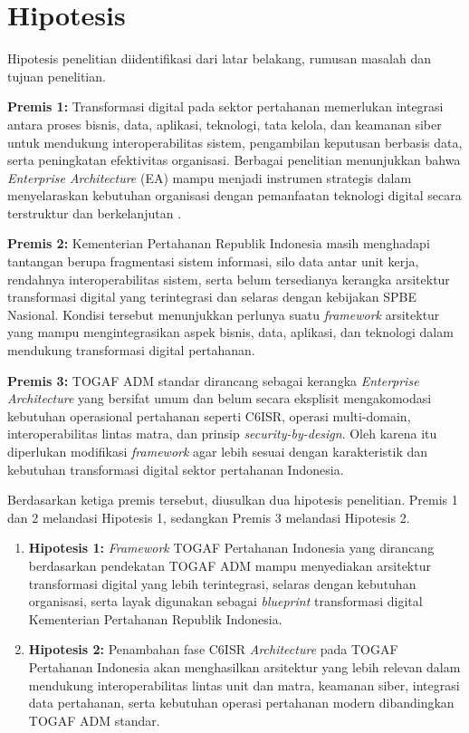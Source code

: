 \section{Hipotesis}
Hipotesis penelitian diidentifikasi dari latar belakang, rumusan masalah dan tujuan penelitian.

\textbf{Premis 1:} Transformasi digital pada sektor pertahanan memerlukan integrasi antara proses bisnis, data, aplikasi, teknologi, tata kelola, dan keamanan siber untuk mendukung interoperabilitas sistem, pengambilan keputusan berbasis data, serta peningkatan efektivitas organisasi.
Berbagai penelitian menunjukkan bahwa \textit{Enterprise Architecture} (EA) mampu menjadi instrumen strategis dalam menyelaraskan kebutuhan organisasi dengan pemanfaatan teknologi digital secara terstruktur dan berkelanjutan \autocite{Syamfithriani,Mattila2022}.

\textbf{Premis 2:} Kementerian Pertahanan Republik Indonesia masih menghadapi tantangan berupa fragmentasi sistem informasi, silo data antar unit kerja, rendahnya interoperabilitas sistem, serta belum tersedianya kerangka arsitektur transformasi digital yang terintegrasi dan selaras dengan kebijakan SPBE Nasional.
Kondisi tersebut menunjukkan perlunya suatu \textit{framework} arsitektur yang mampu mengintegrasikan aspek bisnis, data, aplikasi, dan teknologi dalam mendukung transformasi digital pertahanan.

\textbf{Premis 3:} TOGAF ADM standar dirancang sebagai kerangka \textit{Enterprise Architecture} yang bersifat umum dan belum secara eksplisit mengakomodasi kebutuhan operasional pertahanan seperti C6ISR, operasi multi-domain, interoperabilitas lintas matra, dan prinsip \textit{security-by-design}.
Oleh karena itu diperlukan modifikasi \textit{framework} agar lebih sesuai dengan karakteristik dan kebutuhan transformasi digital sektor pertahanan Indonesia.

Berdasarkan ketiga premis tersebut, diusulkan dua hipotesis penelitian. Premis 1 dan 2 melandasi Hipotesis 1, sedangkan Premis 3 melandasi Hipotesis 2.
\begin{enumerate}
    \item \textbf{Hipotesis 1:} \textit{Framework} TOGAF Pertahanan Indonesia yang dirancang berdasarkan pendekatan TOGAF ADM mampu menyediakan arsitektur transformasi digital yang lebih terintegrasi, selaras dengan kebutuhan organisasi, serta layak digunakan sebagai \textit{blueprint} transformasi digital Kementerian Pertahanan Republik Indonesia.
    \item \textbf{Hipotesis 2:} Penambahan fase C6ISR \textit{Architecture} pada TOGAF Pertahanan Indonesia akan menghasilkan arsitektur yang lebih relevan dalam mendukung interoperabilitas lintas unit dan matra, keamanan siber, integrasi data pertahanan, serta kebutuhan operasi pertahanan modern dibandingkan TOGAF ADM standar.
\end{enumerate}

